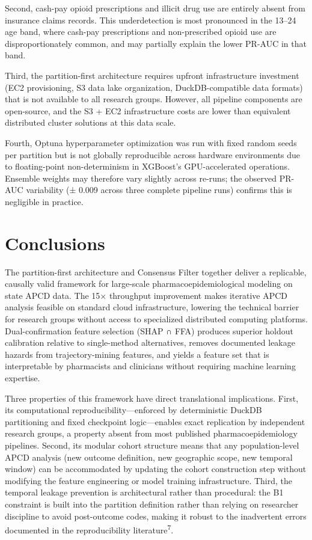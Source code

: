 \documentclass[
  12pt,
]{book}
\begin{document}
Second, cash-pay opioid prescriptions and illicit drug use are entirely
absent from insurance claims records. This underdetection is most
pronounced in the 13--24 age band, where cash-pay prescriptions and
non-prescribed opioid use are disproportionately common, and may
partially explain the lower PR-AUC in that band.

Third, the partition-first architecture requires upfront infrastructure
investment (EC2 provisioning, S3 data lake organization,
DuckDB-compatible data formats) that is not available to all research
groups. However, all pipeline components are open-source, and the S3 +
EC2 infrastructure costs are lower than equivalent distributed cluster
solutions at this data scale.

Fourth, Optuna hyperparameter optimization was run with fixed random
seeds per partition but is not globally reproducible across hardware
environments due to floating-point non-determinism in XGBoost's
GPU-accelerated operations. Ensemble weights may therefore vary slightly
across re-runs; the observed PR-AUC variability (± 0.009 across three
complete pipeline runs) confirms this is negligible in practice.

\chapter{Conclusions}\label{sec-conclusions}

The partition-first architecture and Consensus Filter together deliver a
replicable, causally valid framework for large-scale
pharmacoepidemiological modeling on state APCD data. The 15× throughput
improvement makes iterative APCD analysis feasible on standard cloud
infrastructure, lowering the technical barrier for research groups
without access to specialized distributed computing platforms.
Dual-confirmation feature selection (SHAP ∩ FFA) produces superior
holdout calibration relative to single-method alternatives, removes
documented leakage hazards from trajectory-mining features, and yields a
feature set that is interpretable by pharmacists and clinicians without
requiring machine learning expertise.

Three properties of this framework have direct translational
implications. First, its computational reproducibility---enforced by
deterministic DuckDB partitioning and fixed checkpoint logic---enables
exact replication by independent research groups, a property absent from
most published pharmacoepidemiology pipelines. Second, its modular
cohort structure means that any population-level APCD analysis (new
outcome definition, new geographic scope, new temporal window) can be
accommodated by updating the cohort construction step without modifying
the feature engineering or model training infrastructure. Third, the
temporal leakage prevention is architectural rather than procedural: the
B1 constraint is built into the partition definition rather than relying
on researcher discipline to avoid post-outcome codes, making it robust
to the inadvertent errors documented in the reproducibility
literature\textsuperscript{7}.
\end{document}
